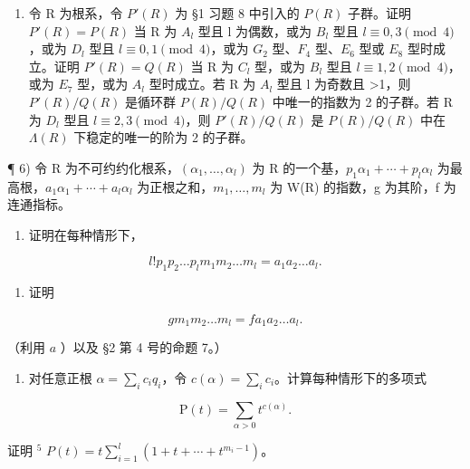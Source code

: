 \begin{enumerate}
\def\labelenumi{\arabic{enumi})}
\setcounter{enumi}{4}
\tightlist
\item
  令 R 为根系，令 \(P'(R)\) 为 §1 习题 8 中引入的 \(P(R)\) 子群。证明 \(P'(R) = P(R)\) 当 R 为 \(A_l\) 型且 l 为偶数，或为 \(B_l\) 型且 \(l \equiv 0,3 \pmod{4}\)，或为 \(D_l\) 型且 \(l \equiv 0,1 \pmod{4}\)，或为 \(G_2\) 型、\(F_4\) 型、\(E_6\) 型或 \(E_8\) 型时成立。证明 \(P'(R) = Q(R)\) 当 R 为 \(C_l\) 型，或为 \(B_l\) 型且 \(l \equiv 1,2 \pmod{4}\)，或为 \(E_7\) 型，或为 \(A_l\) 型时成立。若 R 为 \(A_l\) 型且 l 为奇数且 \textgreater1，则 \(P'(R)/Q(R)\) 是循环群 \(P(R)/Q(R)\) 中唯一的指数为 2 的子群。若 R 为 \(D_l\) 型且 \(l \equiv 2,3 \pmod{4}\)，则 \(P'(R)/Q(R)\) 是 \(P(R)/Q(R)\) 中在 \(\Lambda(R)\) 下稳定的唯一的阶为 2 的子群。
\end{enumerate}

¶ 6) 令 R 为不可约约化根系，\((\alpha_{1},\ldots,\alpha_{l})\) 为 R 的一个基，\(p_{1}\alpha_{1}+\cdots+p_{l}\alpha_{l}\) 为最高根，\(a_{1}\alpha_{1}+\cdots+a_{l}\alpha_{l}\) 为正根之和，\(m_{1},\ldots,m_{l}\) 为 W(R) 的指数，g 为其阶，f 为连通指标。

\begin{enumerate}
\def\labelenumi{\alph{enumi})}
\tightlist
\item
  证明在每种情形下，
\end{enumerate}

\[
l! p _ {1} p _ {2} \dots p _ {l} m _ {1} m _ {2} \dots m _ {l} = a _ {1} a _ {2} \dots a _ {l}.
\]

\begin{enumerate}
\def\labelenumi{\alph{enumi})}
\setcounter{enumi}{1}
\tightlist
\item
  证明
\end{enumerate}

\[
g m _ {1} m _ {2} \dots m _ {l} = f a _ {1} a _ {2} \dots a _ {l}.
\]

（利用 \(a\) ）以及 §2 第 4 号的命题 7。）

\begin{enumerate}
\def\labelenumi{\alph{enumi})}
\setcounter{enumi}{2}
\tightlist
\item
  对任意正根 \(\alpha = \sum_{i} c_{i} q_{i}\)，令 \(c(\alpha) = \sum_{i} c_{i}\)。计算每种情形下的多项式
\end{enumerate}

\[
\mathrm{P} (t) = \sum_ {\alpha > 0} t ^ {c (\alpha)}.
\]

证明 \(^{5}\) \(P(t) = t \sum_{i=1}^{l} (1 + t + \cdots + t^{m_{i}-1})\)。

